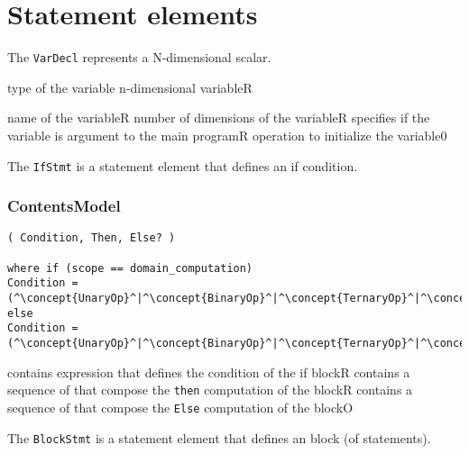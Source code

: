 \section{Statement elements}


The {\tt VarDecl} represents a N-dimensional scalar.

\begin{HIRChildElements}
	{type of the variable n-dimensional variable}{R}
\end{HIRChildElements}

\begin{HIRAttributes}
	{name of the variable}{R}
	{number of dimensions of the variable}{R}
    {specifies if the variable is argument to the main program}{R}
	{operation to initialize the variable}{0}
\end{HIRAttributes}

The {\tt IfStmt} is a statement element that defines an if condition.

\subsubsection*{ContentsModel}{}

\begin{lstlisting}[style=default,frame=none]
( Condition, Then, Else? )

where if (scope == domain_computation)
Condition = (^\concept{UnaryOp}^|^\concept{BinaryOp}^|^\concept{TernaryOp}^|^\concept{FieldAccess}^|^\concept{VarAccess}^|^\concept{Literal}^)
else
Condition = (^\concept{UnaryOp}^|^\concept{BinaryOp}^|^\concept{TernaryOp}^|^\concept{VarAccess}^|^\concept{Literal}^)
\end{lstlisting}

\begin{HIRChildElements}
	{contains expression that defines the condition of the if block}{R}
	{contains a sequence of  that compose the {\tt then} 
	 computation of the block}{R}
	{contains a sequence of  that compose the {\tt Else} 
	 computation of the block}{O}
\end{HIRChildElements}

The {\tt BlockStmt} is a statement element that defines an block (of statements).


